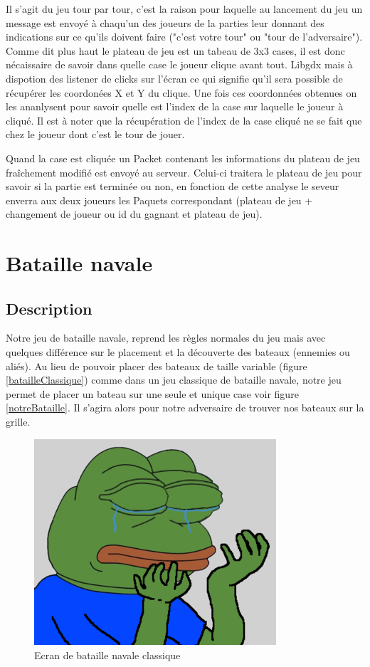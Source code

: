 \documentclass{report}
\begin{document}
Il s'agit du jeu tour par tour, c'est la raison pour laquelle au lancement du jeu un message est envoyé à chaqu'un des joueurs de la parties
leur donnant des indications sur ce qu'ils doivent faire ("c'est votre tour" ou "tour de l'adversaire").
Comme dit plus haut le plateau de jeu est un tabeau de 3x3 cases, il est donc nécaissaire
de savoir dans quelle case le joueur clique avant tout. Libgdx mais à dispotion des listener de clicks sur l'écran ce qui signifie qu'il sera possible
de récupérer les coordonées X et Y du clique. Une fois ces coordonnées obtenues on les ananlysent pour savoir quelle est l'index de la case sur laquelle
le joueur à cliqué. Il est à noter que la récupération de l'index de la case cliqué ne se fait que chez le joueur dont c'est le tour de jouer.

Quand la case est cliquée un Packet contenant les informations du plateau de jeu fraîchement modifié est envoyé au serveur. Celui-ci traitera le plateau de jeu
pour savoir si la partie est terminée ou non, en fonction de cette analyse le seveur enverra aux deux joueurs les Paquets correspondant (plateau de jeu +
 changement de joueur ou id du gagnant et plateau de jeu).

\section{Bataille navale}
\label{Bataille navale}

\subsection{Description}
Notre jeu de bataille navale, reprend les règles normales du jeu mais avec quelques différence sur le placement et la découverte des bateaux (ennemies ou aliés). Au lieu de pouvoir placer
des bateaux de taille variable (figure \ref{batailleClassique}) comme dans un jeu classique de bataille navale, notre jeu permet de placer un bateau sur une seule et unique case
voir figure \ref{notreBataille}. Il s'agira alors pour notre adversaire de trouver nos bateaux sur la grille.

\begin{figure}[H]
	\centering\includegraphics[width=9cm]{batailleClassique}
	\caption{Ecran de bataille navale classique}
	\label{batailleClassiqe}
\end{figure}
\end{document}
